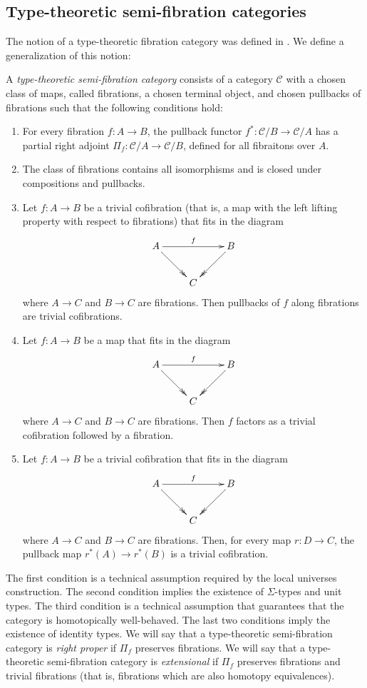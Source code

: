 \documentclass[reqno]{amsart}
\theoremstyle{definition}
\theoremstyle{remark}
\newcommand{\scat}[1]{\mathcal{#1}}
\numberwithin{figure}{section}
\begin{document}
\subsection{Type-theoretic semi-fibration categories}

The notion of a type-theoretic fibration category was defined in \cite[Definition~2.1]{shul-inv}.
We define a generalization of this notion:
\begin{defn}
A \emph{type-theoretic semi-fibration category} consists of a category $\scat{C}$ with a chosen class of maps, called fibrations, a chosen terminal object, and chosen pullbacks of fibrations such that the following conditions hold:
\begin{enumerate}
\item For every fibration $f : A \to B$, the pullback functor $f^* : \scat{C}/B \to \scat{C}/A$ has a partial right adjoint $\Pi_f : \scat{C}/A \to \scat{C}/B$, defined for all fibraitons over $A$.
\item The class of fibrations contains all isomorphisms and is closed under compositions and pullbacks.
\item Let $f : A \to B$ be a trivial cofibration (that is, a map with the left lifting property with respect to fibrations) that fits in the diagram
\[ \xymatrix{ A \ar[rr]^f \ar@{->>}[dr] &   & B \ar@{->>}[dl] \\
                                        & C
            } \]
where $A \to C$ and $B \to C$ are fibrations. Then pullbacks of $f$ along fibrations are trivial cofibrations.
\item Let $f : A \to B$ be a map that fits in the diagram
\[ \xymatrix{ A \ar[rr]^f \ar@{->>}[dr] &   & B \ar@{->>}[dl] \\
                                        & C
            } \]
where $A \to C$ and $B \to C$ are fibrations. Then $f$ factors as a trivial cofibration followed by a fibration.
\item Let $f : A \to B$ be a trivial cofibration that fits in the diagram
\[ \xymatrix{ A \ar[rr]^f \ar@{->>}[dr] &   & B \ar@{->>}[dl] \\
                                        & C
            } \]
where $A \to C$ and $B \to C$ are fibrations. Then, for every map $r : D \to C$, the pullback map $r^*(A) \to r^*(B)$ is a trivial cofibration.
\end{enumerate}
\end{defn}

The first condition is a technical assumption required by the local universes construction.
The second condition implies the existence of $\Sigma$-types and unit types.
The third condition is a technical assumption that guarantees that the category is homotopically well-behaved.
The last two conditions imply the existence of identity types.
We will say that a type-theoretic semi-fibration category is \emph{right proper} if $\Pi_f$ preserves fibrations.
We will say that a type-theoretic semi-fibration category is \emph{extensional} if $\Pi_f$ preserves fibrations and trivial fibrations (that is, fibrations which are also homotopy equivalences).
\end{document}
